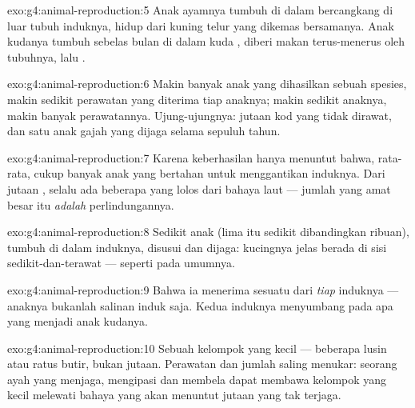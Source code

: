 \begin{solution}{exo:g4:animal-reproduction:5}
Anak ayamnya tumbuh di dalam  bercangkang di luar tubuh induknya,
hidup dari kuning telur yang dikemas bersamanya. Anak kudanya tumbuh
sebelas bulan di dalam kuda , diberi makan terus-menerus oleh
tubuhnya, lalu .
\end{solution}

\begin{solution}{exo:g4:animal-reproduction:6}
Makin banyak anak yang dihasilkan sebuah spesies, makin sedikit
perawatan yang diterima tiap anaknya; makin sedikit anaknya, makin
banyak perawatannya. Ujung-ujungnya: jutaan   kod yang tidak
dirawat, dan satu anak gajah yang dijaga selama sepuluh tahun.
\end{solution}

\begin{solution}{exo:g4:animal-reproduction:7}
Karena keberhasilan hanya menuntut bahwa, rata-rata, cukup banyak anak
yang bertahan untuk menggantikan induknya. Dari jutaan , selalu
ada beberapa yang lolos dari bahaya laut --- jumlah yang amat besar
itu \emph{adalah} perlindungannya.
\end{solution}

\begin{solution}{exo:g4:animal-reproduction:8}
Sedikit anak (lima itu sedikit dibandingkan ribuan), tumbuh di dalam
induknya, disusui dan dijaga: kucingnya jelas berada di sisi
sedikit-dan-terawat --- seperti  pada umumnya.
\end{solution}

\begin{solution}{exo:g4:animal-reproduction:9}
Bahwa ia menerima sesuatu dari \emph{tiap} induknya --- anaknya
bukanlah salinan induk  saja. Kedua induknya menyumbang pada
apa yang menjadi anak kudanya.
\end{solution}

\begin{solution}{exo:g4:animal-reproduction:10}
Sebuah kelompok  yang kecil --- beberapa lusin atau ratus butir,
bukan jutaan. Perawatan dan jumlah saling menukar: seorang ayah yang
menjaga, mengipasi dan membela dapat membawa kelompok  yang kecil
melewati bahaya yang akan menuntut jutaan  yang tak terjaga.
\end{solution}

